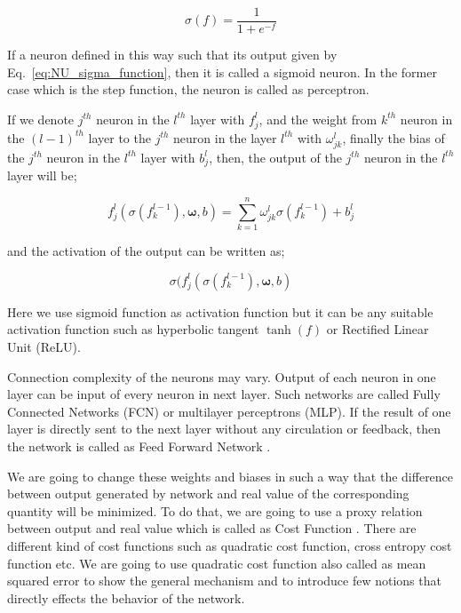 \documentclass[a4paper,times,hidelinks,12pt]{article}
\begin{document}
\begin{equation}
\label{eq:NU_sigma_function}
\sigma(f) = \frac{1}{1 + e^{-f}}
\end{equation}

\noindent If a neuron defined in this way such that its output given by Eq.~\eqref{eq:NU_sigma_function}, then it is called a sigmoid neuron. In the former case which is the step function, the neuron is called as perceptron. 

If we denote $j^{th}$ neuron in the $l^{th}$ layer with $f_j^l$, and the weight from $k^{th}$ neuron in the $(l-1)^{th}$ layer to the $j^{th}$ neuron in the layer $l^{th}$ with $\omega_{jk}^l$, finally the bias of the $j^{th}$ neuron in the $l^{th}$ layer with ${b_j^l}$, then, the output of the $j^{th}$ neuron in the $l^{th}$ layer will be;

\begin{equation}
\label{eq:NU_neuron_connection}
f_j^{l}(\sigma(f_k^{l-1}), \boldsymbol{\omega}, b) = \sum\limits_{k=1}^{n} \omega_{jk}^{l}\sigma(f_k^{l-1}) + b_j^l
\end{equation}

\noindent and the activation of the output can be written as;

\begin{equation}
\sigma(f_j^{l}(\sigma(f_k^{l-1}), \boldsymbol{\omega}, b)
\end{equation}


\noindent Here we use sigmoid function as activation function but it can be any suitable activation function such as hyperbolic tangent $\tanh(f)$ or Rectified Linear Unit (ReLU).

Connection complexity of the neurons may vary. Output of each neuron in one layer can be input of every neuron in next layer. Such networks are called Fully Connected Networks (FCN) or multilayer perceptrons (MLP). If the result of one layer is directly sent to the next layer without any circulation or feedback, then the network is called as Feed Forward Network \cite{nielsen2015neural}.

We are going to change these weights and biases in such a way that the difference between output generated by network and real value of the corresponding quantity will be minimized. To do that, we are going to use a proxy relation between output and real value which is called as Cost Function \cite{nielsen2015neural}. There are different kind of cost functions such as quadratic cost function, cross entropy cost function etc. We are going to use quadratic cost function also called as mean squared error to show the general mechanism and to introduce few notions that directly effects the behavior of the network. 
\end{document}
